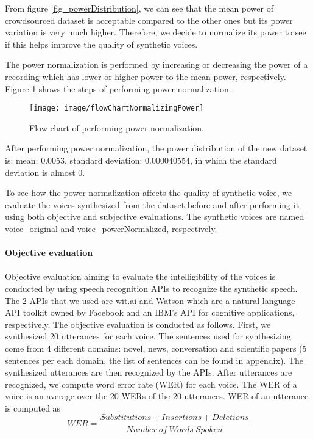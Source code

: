 \documentclass[12pt]{article}
\begin{document}
From figure \ref{fig_powerDistribution}, we can see that the mean power of crowdsourced dataset is acceptable compared to the other ones but its power variation is very much higher. Therefore, we decide to normalize its power to see if this helps improve the quality of synthetic voices.

The power normalization is performed by increasing or decreasing the power of a recording which has lower or higher power to the mean power, respectively. Figure \ref{fig_normalizingPower} shows the steps of performing power normalization.

\begin{figure}[t]
\begin{center}
\texttt{[image: image/flowChartNormalizingPower]}
\end{center}
\vspace{-0.3cm}
\caption[performing power normalization.]{Flow chart of performing power normalization.}
\label{fig_normalizingPower}
\end{figure}

After performing power normalization, the power distribution of the new dataset is: mean: 0.0053, standard deviation: 0.000040554, in which the standard deviation is almost 0.

To see how the power normalization affects the quality of synthetic voice, we evaluate the voices synthesized from the dataset before and after performing it using both objective and subjective evaluations. The synthetic voices are named voice\_original and voice\_powerNormalized, respectively.\\\\
\textbf{Objective evaluation}\\\\
Objective evaluation aiming to evaluate the intelligibility of the voices is conducted by using speech recognition APIs to recognize the synthetic speech. The 2 APIs that we used are wit.ai and Watson which are a natural language API toolkit owned by Facebook and an IBM’s API for cognitive applications, respectively.
The objective evaluation is conducted as follows.
First, we synthesized 20 utterances for each voice. The sentences used for synthesizing come from 4 different domains: novel, news, conversation and scientific papers (5 sentences per each domain, the list of sentences can be found in appendix). The synthesized utterances are then recognized by the APIs. After utterances are recognized, we compute word error rate (WER) for each voice. The WER of a voice is an average over the 20 WERs of the 20 utterances. WER of an utterance is computed as
\begin{equation}\label{exp_wer}
    WER = \frac{Substitutions + Insertions + Deletions}{Number\:of\:Words\:Spoken}
\end{equation}
\end{document}
